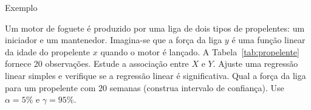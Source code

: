 \documentclass[8pt]{beamer}
\begin{document}
\begin{frame}{Exemplo}

\normalsize

	Um motor de foguete é produzido por uma liga de dois tipos de propelentes: um iniciador e um mantenedor. Imagina-se que a força da liga $y$ é uma função linear da idade do propelente $x$ quando o motor é lançado. A Tabela~\ref{tab:propelente} fornece 20 observações. Estude a associação entre $X$ e $Y$. Ajuste uma regressão linear simples e verifique se a regressão linear é significativa. Qual a força da liga para um propelente com $20$ semanas (construa intervalo de confiança). Use $\alpha=5\%$ e $\gamma = 95\%$. 
	\vfill
	
	\begin{minipage}{0.45\linewidth}
		\begin{table}[ht]
			\centering
			\caption{Dados sobre propelentes de foguetes.} 
			\label{tab:propelente}
		\end{table}
	\end{minipage}	

\end{frame}
\end{document}
